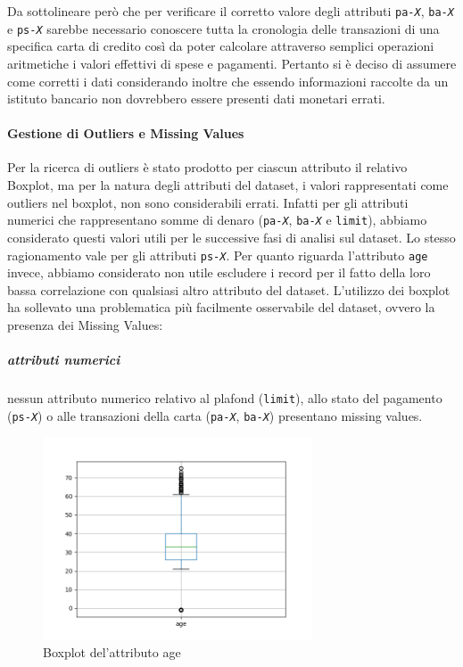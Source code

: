 Da sottolineare per\`o che per verificare il corretto
valore degli attributi  \texttt{pa-\textit{X}},
\texttt{ba-\textit{X}} e \texttt{ps-\textit{X}} sarebbe
necessario conoscere tutta la cronologia delle transazioni
di una specifica carta di credito cos\`i da poter calcolare
attraverso semplici operazioni aritmetiche i valori effettivi
di spese e pagamenti. Pertanto si \`e deciso di assumere come
corretti i dati considerando inoltre che essendo informazioni
raccolte da un istituto bancario non dovrebbero essere presenti
dati monetari errati. 

\paragraph{Gestione di Outliers e Missing Values}
Per la ricerca di outliers \`e stato prodotto per ciascun
attributo il relativo Boxplot, ma per la natura degli attributi
del dataset, i valori rappresentati come outliers nel boxplot,
non sono considerabili errati. Infatti per gli attributi numerici
che rappresentano somme di denaro (\texttt{pa-\textit{X}},
\texttt{ba-\textit{X}} e \texttt{limit}), abbiamo considerato
questi valori utili per le successive fasi di analisi sul
dataset. Lo stesso ragionamento vale per gli attributi 
\texttt{ps-\textit{X}}. Per quanto riguarda l'attributo
\texttt{age} invece, abbiamo considerato non utile escludere i record
per il fatto della loro bassa correlazione con qualsiasi altro attributo
del dataset. L'utilizzo dei boxplot ha sollevato una problematica
pi\`u facilmente osservabile del dataset, ovvero la presenza
dei Missing Values:

\subparagraph{attributi numerici}
 nessun attributo numerico relativo al plafond (\texttt{limit}), allo stato del pagamento (\texttt{ps-\textit{X}}) o alle transazioni della carta (\texttt{pa-\textit{X}}, \texttt{ba-\textit{X}}) presentano missing values.
 
\begin{figure}
\centering
\includegraphics[width=8cm]{img/age-boxplot.png}
\caption{Boxplot del'attributo age}
\end{figure}

